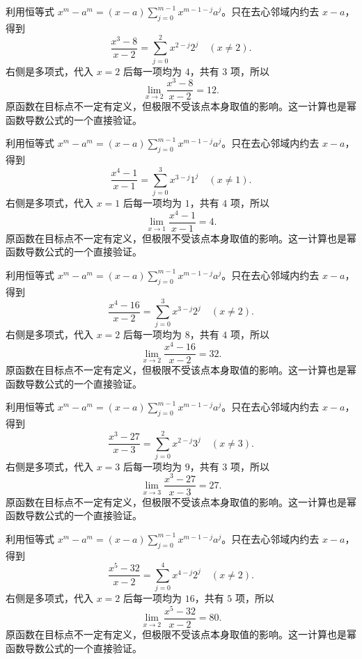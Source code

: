 \documentclass[UTF8,12pt,a4paper,fontset=fandol]{ctexart}
\begin{document}
\begin{solve}\label{ans:c3q3}
利用恒等式 $x^m-a^m=(x-a)\sum_{j=0}^{m-1}x^{m-1-j}a^j$。只在去心邻域内约去 $x-a$，得到
\[
\frac{x^{3}-8}{x-2}=\sum_{j=0}^{2}x^{2-j}2^j\quad(x\ne 2).
\]
右侧是多项式，代入 $x=2$ 后每一项均为 $4$，共有 $3$ 项，所以
\[
\lim_{x\to 2}\frac{x^{3}-8}{x-2}=12.
\]
原函数在目标点不一定有定义，但极限不受该点本身取值的影响。这一计算也是幂函数导数公式的一个直接验证。
\end{solve}

\begin{solve}\label{ans:c3q4}
利用恒等式 $x^m-a^m=(x-a)\sum_{j=0}^{m-1}x^{m-1-j}a^j$。只在去心邻域内约去 $x-a$，得到
\[
\frac{x^{4}-1}{x-1}=\sum_{j=0}^{3}x^{3-j}1^j\quad(x\ne 1).
\]
右侧是多项式，代入 $x=1$ 后每一项均为 $1$，共有 $4$ 项，所以
\[
\lim_{x\to 1}\frac{x^{4}-1}{x-1}=4.
\]
原函数在目标点不一定有定义，但极限不受该点本身取值的影响。这一计算也是幂函数导数公式的一个直接验证。
\end{solve}

\begin{solve}\label{ans:c3q5}
利用恒等式 $x^m-a^m=(x-a)\sum_{j=0}^{m-1}x^{m-1-j}a^j$。只在去心邻域内约去 $x-a$，得到
\[
\frac{x^{4}-16}{x-2}=\sum_{j=0}^{3}x^{3-j}2^j\quad(x\ne 2).
\]
右侧是多项式，代入 $x=2$ 后每一项均为 $8$，共有 $4$ 项，所以
\[
\lim_{x\to 2}\frac{x^{4}-16}{x-2}=32.
\]
原函数在目标点不一定有定义，但极限不受该点本身取值的影响。这一计算也是幂函数导数公式的一个直接验证。
\end{solve}

\begin{solve}\label{ans:c3q6}
利用恒等式 $x^m-a^m=(x-a)\sum_{j=0}^{m-1}x^{m-1-j}a^j$。只在去心邻域内约去 $x-a$，得到
\[
\frac{x^{3}-27}{x-3}=\sum_{j=0}^{2}x^{2-j}3^j\quad(x\ne 3).
\]
右侧是多项式，代入 $x=3$ 后每一项均为 $9$，共有 $3$ 项，所以
\[
\lim_{x\to 3}\frac{x^{3}-27}{x-3}=27.
\]
原函数在目标点不一定有定义，但极限不受该点本身取值的影响。这一计算也是幂函数导数公式的一个直接验证。
\end{solve}

\begin{solve}\label{ans:c3q7}
利用恒等式 $x^m-a^m=(x-a)\sum_{j=0}^{m-1}x^{m-1-j}a^j$。只在去心邻域内约去 $x-a$，得到
\[
\frac{x^{5}-32}{x-2}=\sum_{j=0}^{4}x^{4-j}2^j\quad(x\ne 2).
\]
右侧是多项式，代入 $x=2$ 后每一项均为 $16$，共有 $5$ 项，所以
\[
\lim_{x\to 2}\frac{x^{5}-32}{x-2}=80.
\]
原函数在目标点不一定有定义，但极限不受该点本身取值的影响。这一计算也是幂函数导数公式的一个直接验证。
\end{solve}
\end{document}
